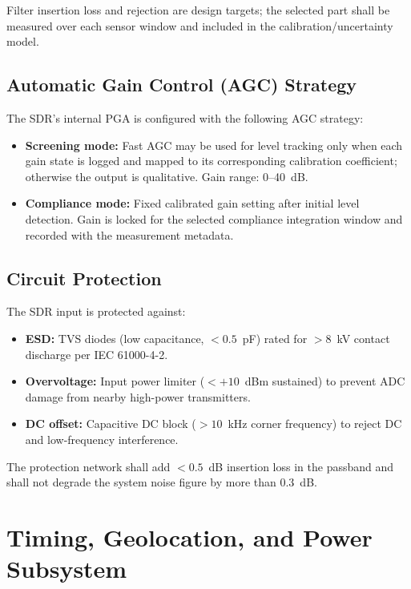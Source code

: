 \documentclass[11pt,a4paper]{article}
\begin{document}
\noindent Filter insertion loss and rejection are design targets; the selected part shall be measured over each sensor window and included in the calibration/uncertainty model.

\subsection{Automatic Gain Control (AGC) Strategy}

The SDR's internal PGA is configured with the following AGC strategy:

\begin{itemize}
    \item \textbf{Screening mode:} Fast AGC may be used for level tracking only when each gain state is logged and mapped to its corresponding calibration coefficient; otherwise the output is qualitative. Gain range: 0--40~dB.
    \item \textbf{Compliance mode:} Fixed calibrated gain setting after initial level detection. Gain is locked for the selected compliance integration window and recorded with the measurement metadata.
\end{itemize}

\subsection{Circuit Protection}

The SDR input is protected against:

\begin{itemize}
    \item \textbf{ESD:} TVS diodes (low capacitance, $< 0.5$~pF) rated for $> 8$~kV contact discharge per IEC 61000-4-2.
    \item \textbf{Overvoltage:} Input power limiter ($< +10$~dBm sustained) to prevent ADC damage from nearby high-power transmitters.
    \item \textbf{DC offset:} Capacitive DC block ($> 10$~kHz corner frequency) to reject DC and low-frequency interference.
\end{itemize}

\noindent The protection network shall add $< 0.5$~dB insertion loss in the passband and shall not degrade the system noise figure by more than 0.3~dB.

\section{Timing, Geolocation, and Power Subsystem}
\label{sec:auxiliary_subsystems}
\end{document}
